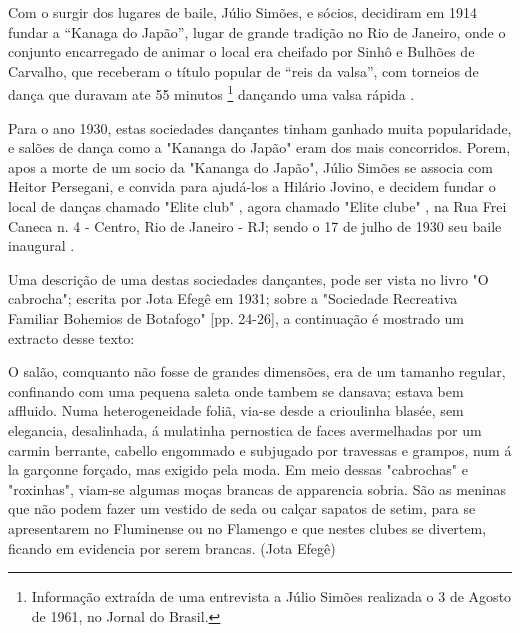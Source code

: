 Com o surgir dos lugares de baile, 
Júlio Simões, e sócios, decidiram em 1914 fundar a ``Kanaga do Japão'',
lugar de grande tradição no Rio de Janeiro,
onde o conjunto encarregado de animar o local era cheifado por Sinhô e Bulhões de Carvalho,
que receberam o título popular de ``reis da valsa'',
com torneios de dança que duravam ate 55 
minutos \footnote{Informação extraída de uma entrevista a Júlio Simões realizada o 3 de Agosto de 1961, no Jornal do Brasil.} 
dançando uma valsa rápida \cite[pp. 3]{entrevistajuliojournalbrasil1}.

Para o ano 1930, estas sociedades dançantes tinham ganhado muita popularidade, e salões de dança como a
"Kananga do Japão" eram dos mais concorridos. Porem,
apos a morte de um socio da "Kananga do Japão", 
Júlio Simões se associa com Heitor Persegani, e convida para ajudá-los a Hilário Jovino, 
e decidem fundar o local de danças chamado "Elite club" \cite[pp. 11]{eliteinaugura},
agora chamado "Elite clube" \cite[pp. 3]{juliosimoes},
na Rua Frei Caneca n. 4 - Centro, Rio de Janeiro - RJ;
sendo o 17 de julho de 1930 seu baile inaugural 
\cite[pp. 11]{eliteinaugura} \cite[pp. 3]{juliosimoes} \cite[pp. 10]{simoesjournalbrasil1}.

Uma descrição de uma destas sociedades dançantes, pode ser vista no livro "O cabrocha"; 
escrita  por Jota Efegê em 1931; 
sobre a "Sociedade Recreativa Familiar Bohemios de Botafogo" [pp. 24-26]\cite{jotaefege},
a continuação é mostrado um extracto desse texto:
\begin{tcolorbox}[breakable,colback=colorlowgray,colframe=colorlowgray]%
O salão, comquanto não fosse de grandes dimensões, era
de um tamanho regular, confinando com uma pequena saleta
onde tambem se dansava; estava bem affluido. Numa
heterogeneidade foliã, via-se desde a crioulinha blasée, sem
elegancia, desalinhada, á mulatinha pernostica de faces
avermelhadas por um carmin berrante, cabello engommado e
subjugado por travessas e grampos, num á la garçonne
forçado, mas exigido pela moda. Em meio dessas "cabrochas"
e "roxinhas", viam-se algumas moças brancas de apparencia
sobria. São as meninas que não podem fazer um vestido de
seda ou calçar sapatos de setim, para se apresentarem no
Fluminense ou no Flamengo e que nestes clubes se divertem,
ficando em evidencia por serem brancas.  %
(Jota Efegê)
\end{tcolorbox}



